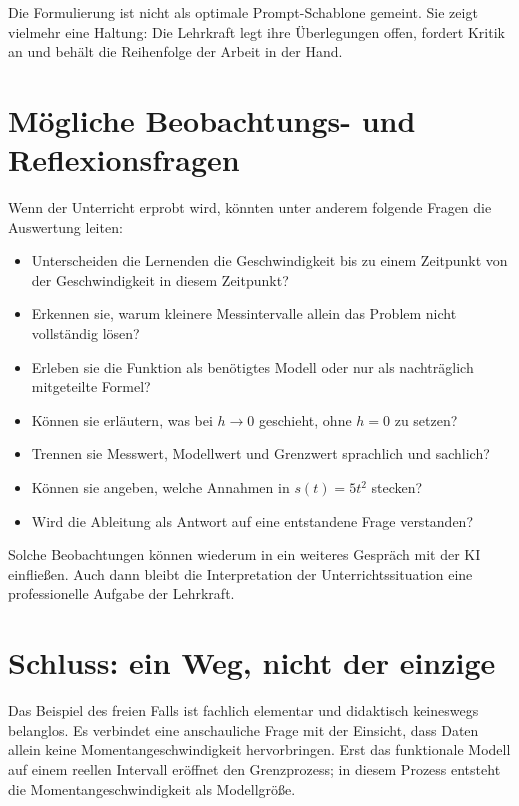 \documentclass[11pt,a4paper]{article}
\begin{document}
Die Formulierung ist nicht als optimale Prompt-Schablone gemeint. Sie zeigt
vielmehr eine Haltung: Die Lehrkraft legt ihre Überlegungen offen, fordert
Kritik an und behält die Reihenfolge der Arbeit in der Hand.


\section{Mögliche Beobachtungs- und Reflexionsfragen}

Wenn der Unterricht erprobt wird, könnten unter anderem folgende Fragen die
Auswertung leiten:

\begin{itemize}
  \item Unterscheiden die Lernenden die Geschwindigkeit bis zu einem Zeitpunkt
        von der Geschwindigkeit in diesem Zeitpunkt?
  \item Erkennen sie, warum kleinere Messintervalle allein das Problem nicht
        vollständig lösen?
  \item Erleben sie die Funktion als benötigtes Modell oder nur als nachträglich
        mitgeteilte Formel?
  \item Können sie erläutern, was bei $h\to 0$ geschieht, ohne $h=0$ zu setzen?
  \item Trennen sie Messwert, Modellwert und Grenzwert sprachlich und sachlich?
  \item Können sie angeben, welche Annahmen in $s(t)=5t^2$ stecken?
  \item Wird die Ableitung als Antwort auf eine entstandene Frage verstanden?
\end{itemize}

Solche Beobachtungen können wiederum in ein weiteres Gespräch mit der KI
einfließen. Auch dann bleibt die Interpretation der Unterrichtssituation eine
professionelle Aufgabe der Lehrkraft.


\section{Schluss: ein Weg, nicht der einzige}

Das Beispiel des freien Falls ist fachlich elementar und didaktisch keineswegs
belanglos. Es verbindet eine anschauliche Frage mit der Einsicht, dass Daten
allein keine Momentangeschwindigkeit hervorbringen. Erst das funktionale Modell
auf einem reellen Intervall eröffnet den Grenzprozess; in diesem Prozess entsteht
die Momentangeschwindigkeit als Modellgröße.
\end{document}
